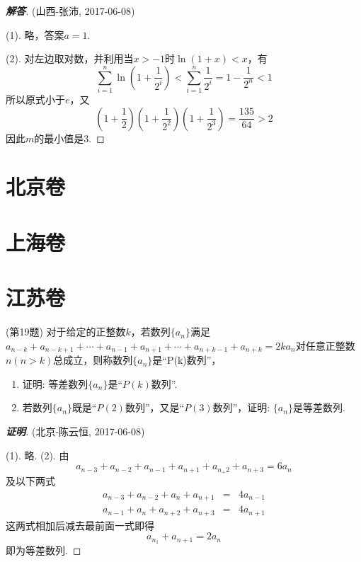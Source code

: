 \documentclass{ctexart}
\begin{document}
\begin{proof}[\textbf{解答}](山西-张沛, 2017-06-08)

  (1). 略，答案$a=1$.

  (2). 对左边取对数，并利用当$x>-1$时$\ln{(1+x)}<x$，有
  \[ \sum_{i=1}^n \ln{\left( 1+\frac{1}{2^i} \right)} < \sum_{i=1}^n \frac{1}{2^i} = 1-\frac{1}{2^n} < 1 \]
  所以原式小于$e$，又
  \[ \left( 1+\frac{1}{2} \right)\left( 1+\frac{1}{2^2} \right)\left( 1+\frac{1}{2^3} \right) = \frac{135}{64}>2 \]
  因此$m$的最小值是3.
\end{proof}

\section{北京卷}
\label{sec:beijing}

\section{上海卷}
\label{sec:shanghai}

\section{江苏卷}
\label{sec:jiangshu}

\begin{exercise}(第19题)
  对于给定的正整数$k$，若数列$\{a_n\}$满足$a_{n-k}+a_{n-k+1}+\cdots+a_{n-1}+a_{n+1}+\cdots+a_{n+k-1}+a_{n+k}=2ka_n$对任意正整数$n(n>k)$总成立，则称数列$\{a_n\}$是“P(k)数列”，
  \begin{enumerate}
  \item 证明: 等差数列$\{a_n\}$是“$P(k)$数列”.
  \item 若数列$\{a_n\}$既是“$P(2)$数列”，又是“$P(3)$数列”，证明: $\{a_n\}$是等差数列.
  \end{enumerate}
\end{exercise}

\begin{proof}[\textbf{证明}] (北京-陈云恒, 2017-06-08)

  (1). 略.
  (2). 由
  \[ a_{n-3}+a_{n-2}+a_{n-1}+a_{n+1}+a_{n_+2}+a_{n+3}=6a_n \]
  及以下两式
  \begin{eqnarray*}
    a_{n-3}+a_{n-2}+a_n+a_{n+1} & = &4a_{n-1} \\
    a_{n-1}+a_n+a_{n+2}+a_{n+3} & = &4a_{n+1} 
  \end{eqnarray*}
  这两式相加后减去最前面一式即得
  \[ a_{n_1}+a_{n+1}=2a_n \]
  即为等差数列.
\end{proof}
\end{document}
